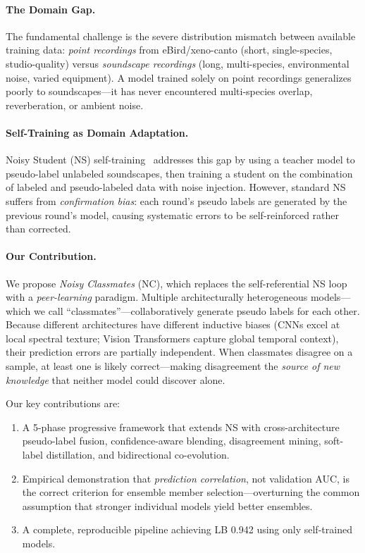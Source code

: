 \documentclass[a4paper]{article}
\begin{document}
\paragraph{The Domain Gap.}
The fundamental challenge is the severe distribution mismatch between available training data:
\emph{point recordings} from eBird/xeno-canto (short, single-species, studio-quality) versus
\emph{soundscape recordings} (long, multi-species, environmental noise, varied equipment).
A model trained solely on point recordings generalizes poorly to soundscapes---it has never encountered multi-species overlap, reverberation, or ambient noise.

\paragraph{Self-Training as Domain Adaptation.}
Noisy Student (NS) self-training~\citep{xie2020self} addresses this gap by using a teacher model to pseudo-label unlabeled soundscapes, then training a student on the combination of labeled and pseudo-labeled data with noise injection.
However, standard NS suffers from \emph{confirmation bias}: each round's pseudo labels are generated by the previous round's model, causing systematic errors to be self-reinforced rather than corrected.

\paragraph{Our Contribution.}
We propose \emph{Noisy Classmates} (NC), which replaces the self-referential NS loop with a \emph{peer-learning} paradigm.
Multiple architecturally heterogeneous models---which we call ``classmates''---collaboratively generate pseudo labels for each other.
Because different architectures have different inductive biases (CNNs excel at local spectral texture; Vision Transformers capture global temporal context), their prediction errors are partially independent.
When classmates disagree on a sample, at least one is likely correct---making disagreement the \emph{source of new knowledge} that neither model could discover alone.

Our key contributions are:
\begin{enumerate}[nosep]
    \item A 5-phase progressive framework that extends NS with cross-architecture pseudo-label fusion, confidence-aware blending, disagreement mining, soft-label distillation, and bidirectional co-evolution.
    \item Empirical demonstration that \emph{prediction correlation}, not validation AUC, is the correct criterion for ensemble member selection---overturning the common assumption that stronger individual models yield better ensembles.
    \item A complete, reproducible pipeline achieving LB 0.942 using only self-trained models.
\end{enumerate}
\end{document}

